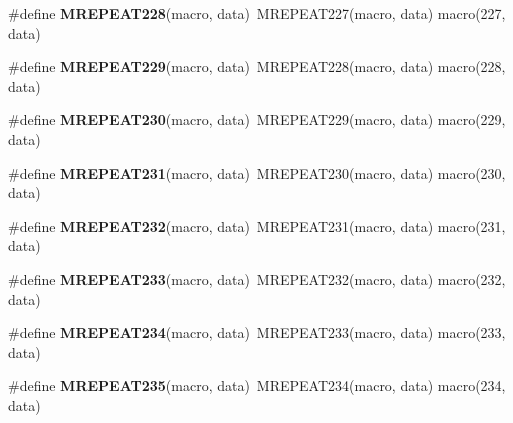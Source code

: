 \begin{DoxyCompactItemize}
\item 
\hypertarget{group__group__sam0__utils__mrepeat_ga1976e9b1599c79c7dd75bdeefb924fba}{}\#define {\bfseries M\+R\+E\+P\+E\+A\+T228}(macro,  data)~M\+R\+E\+P\+E\+A\+T227(macro, data)   macro(227, data)\label{group__group__sam0__utils__mrepeat_ga1976e9b1599c79c7dd75bdeefb924fba}

\item 
\hypertarget{group__group__sam0__utils__mrepeat_ga0f5e93e8a648f55e0d193221c016771a}{}\#define {\bfseries M\+R\+E\+P\+E\+A\+T229}(macro,  data)~M\+R\+E\+P\+E\+A\+T228(macro, data)   macro(228, data)\label{group__group__sam0__utils__mrepeat_ga0f5e93e8a648f55e0d193221c016771a}

\item 
\hypertarget{group__group__sam0__utils__mrepeat_ga4e98b44455fc8c2a542de807ef8f2535}{}\#define {\bfseries M\+R\+E\+P\+E\+A\+T230}(macro,  data)~M\+R\+E\+P\+E\+A\+T229(macro, data)   macro(229, data)\label{group__group__sam0__utils__mrepeat_ga4e98b44455fc8c2a542de807ef8f2535}

\item 
\hypertarget{group__group__sam0__utils__mrepeat_ga3f6882a8daac99c9571e37fd306c5451}{}\#define {\bfseries M\+R\+E\+P\+E\+A\+T231}(macro,  data)~M\+R\+E\+P\+E\+A\+T230(macro, data)   macro(230, data)\label{group__group__sam0__utils__mrepeat_ga3f6882a8daac99c9571e37fd306c5451}

\item 
\hypertarget{group__group__sam0__utils__mrepeat_ga7adad754d082734bb39548d811081bc3}{}\#define {\bfseries M\+R\+E\+P\+E\+A\+T232}(macro,  data)~M\+R\+E\+P\+E\+A\+T231(macro, data)   macro(231, data)\label{group__group__sam0__utils__mrepeat_ga7adad754d082734bb39548d811081bc3}

\item 
\hypertarget{group__group__sam0__utils__mrepeat_ga859709294d903b0f32c05695158fe8a6}{}\#define {\bfseries M\+R\+E\+P\+E\+A\+T233}(macro,  data)~M\+R\+E\+P\+E\+A\+T232(macro, data)   macro(232, data)\label{group__group__sam0__utils__mrepeat_ga859709294d903b0f32c05695158fe8a6}

\item 
\hypertarget{group__group__sam0__utils__mrepeat_gadff2111488b4bd5fc5d6407ec9dccefd}{}\#define {\bfseries M\+R\+E\+P\+E\+A\+T234}(macro,  data)~M\+R\+E\+P\+E\+A\+T233(macro, data)   macro(233, data)\label{group__group__sam0__utils__mrepeat_gadff2111488b4bd5fc5d6407ec9dccefd}

\item 
\hypertarget{group__group__sam0__utils__mrepeat_ga5d3644eeaec5d2fe9d9055cc6581ed1d}{}\#define {\bfseries M\+R\+E\+P\+E\+A\+T235}(macro,  data)~M\+R\+E\+P\+E\+A\+T234(macro, data)   macro(234, data)\label{group__group__sam0__utils__mrepeat_ga5d3644eeaec5d2fe9d9055cc6581ed1d}


\end{DoxyCompactItemize}
